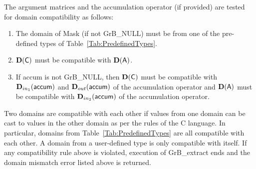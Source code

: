 The argument matrices and the accumulation 
operator (if provided) are tested for domain compatibility as follows:
\begin{enumerate}
	\item The domain of {\sf Mask} (if not {\sf GrB\_NULL}) must be from one of
    the pre-defined types of Table~\ref{Tab:PredefinedTypes}.

	\item $\bold{D}({\sf C})$ must be
    compatible with $\bold{D}({\sf A})$.

	\item If {\sf accum} is not {\sf GrB\_NULL}, then $\bold{D}({\sf C})$ must be
    compatible with $\mbox{$\mathbf{D}_{in_{1}}$}({\sf accum})$ and $\mbox{$\mathbf{D}_{out}$}({\sf accum})$ of the accumulation operator and 
    $\bold{D}({\sf A})$ must be compatible with $\mbox{$\mathbf{D}_{in_{2}}$}({\sf accum})$ of the accumulation operator.
\end{enumerate}
Two domains are compatible with each other if values from one domain can be cast 
to values in the other domain as per the rules of the C language.
In particular, domains from Table~\ref{Tab:PredefinedTypes} are all compatible 
with each other. A domain from a user-defined type is only compatible with itself.
If any compatibility rule above is violated, execution of {\sf GrB\_extract} ends and 
the domain mismatch error listed above is returned.

